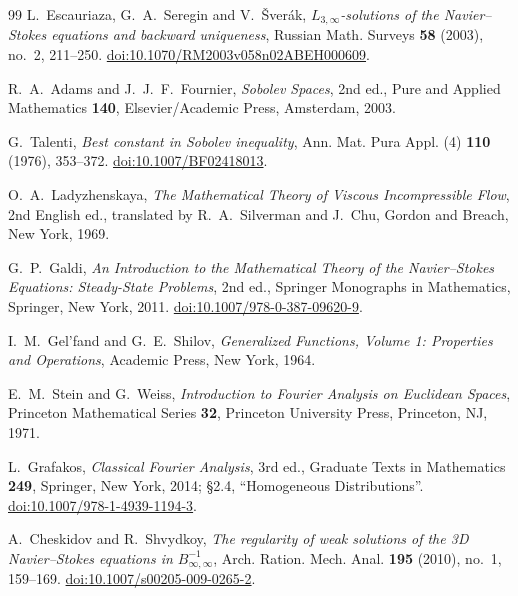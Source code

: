 \documentclass[11pt]{article}
\theoremstyle{definition}
\begin{document}
\begin{thebibliography}{99}
L.~Escauriaza, G.~A.~Seregin and V.~\v{S}ver\'ak,
\emph{$L_{3,\infty}$-solutions of the Navier--Stokes equations and backward
uniqueness},
Russian Math. Surveys \textbf{58} (2003), no.~2, 211--250.
\href{https://doi.org/10.1070/RM2003v058n02ABEH000609}{doi:10.1070/RM2003v058n02ABEH000609}.

R.~A.~Adams and J.~J.~F.~Fournier,
\emph{Sobolev Spaces}, 2nd ed.,
Pure and Applied Mathematics \textbf{140},
Elsevier/Academic Press, Amsterdam, 2003.

G.~Talenti,
\emph{Best constant in Sobolev inequality},
Ann. Mat. Pura Appl. (4) \textbf{110} (1976), 353--372.
\href{https://doi.org/10.1007/BF02418013}{doi:10.1007/BF02418013}.

O.~A.~Ladyzhenskaya,
\emph{The Mathematical Theory of Viscous Incompressible Flow},
2nd English ed., translated by R.~A.~Silverman and J.~Chu,
Gordon and Breach, New York, 1969.

G.~P.~Galdi,
\emph{An Introduction to the Mathematical Theory of the Navier--Stokes
Equations: Steady-State Problems}, 2nd ed.,
Springer Monographs in Mathematics, Springer, New York, 2011.
\href{https://doi.org/10.1007/978-0-387-09620-9}{doi:10.1007/978-0-387-09620-9}.

I.~M.~Gel'fand and G.~E.~Shilov,
\emph{Generalized Functions, Volume 1: Properties and Operations},
Academic Press, New York, 1964.

E.~M.~Stein and G.~Weiss,
\emph{Introduction to Fourier Analysis on Euclidean Spaces},
Princeton Mathematical Series \textbf{32},
Princeton University Press, Princeton, NJ, 1971.

L.~Grafakos,
\emph{Classical Fourier Analysis}, 3rd ed.,
Graduate Texts in Mathematics \textbf{249}, Springer, New York, 2014;
\S2.4, ``Homogeneous Distributions''.
\href{https://doi.org/10.1007/978-1-4939-1194-3}{doi:10.1007/978-1-4939-1194-3}.

A.~Cheskidov and R.~Shvydkoy,
\emph{The regularity of weak solutions of the 3D Navier--Stokes equations in
$B^{-1}_{\infty,\infty}$},
Arch. Ration. Mech. Anal. \textbf{195} (2010), no.~1, 159--169.
\href{https://doi.org/10.1007/s00205-009-0265-2}{doi:10.1007/s00205-009-0265-2}.


\end{thebibliography}
\end{document}
